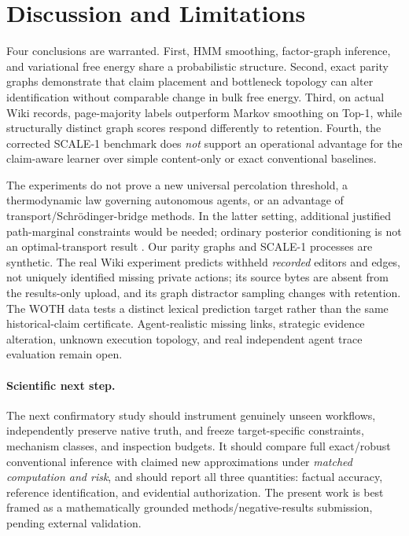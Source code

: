 \documentclass[10pt,twocolumn]{article}
\begin{document}
\section{Discussion and Limitations}
Four conclusions are warranted. First, HMM smoothing, factor-graph inference, and variational free energy share a probabilistic structure. Second, exact parity graphs demonstrate that claim placement and bottleneck topology can alter identification without comparable change in bulk free energy. Third, on actual Wiki records, page-majority labels outperform Markov smoothing on Top-1, while structurally distinct graph scores respond differently to retention. Fourth, the corrected SCALE-1 benchmark does \emph{not} support an operational advantage for the claim-aware learner over simple content-only or exact conventional baselines.

The experiments do not prove a new universal percolation threshold, a thermodynamic law governing autonomous agents, or an advantage of transport/Schr\"odinger-bridge methods. In the latter setting, additional justified path-marginal constraints would be needed; ordinary posterior conditioning is not an optimal-transport result \cite{blumenthal2026}. Our parity graphs and SCALE-1 processes are synthetic. The real Wiki experiment predicts withheld \emph{recorded} editors and edges, not uniquely identified missing private actions; its source bytes are absent from the results-only upload, and its graph distractor sampling changes with retention. The WOTH data tests a distinct lexical prediction target rather than the same historical-claim certificate. Agent-realistic missing links, strategic evidence alteration, unknown execution topology, and real independent agent trace evaluation remain open.

\paragraph{Scientific next step.} The next confirmatory study should instrument genuinely unseen workflows, independently preserve native truth, and freeze target-specific constraints, mechanism classes, and inspection budgets. It should compare full exact/robust conventional inference with claimed new approximations under \emph{matched computation and risk}, and should report all three quantities: factual accuracy, reference identification, and evidential authorization. The present work is best framed as a mathematically grounded methods/negative-results submission, pending external validation.
\end{document}
